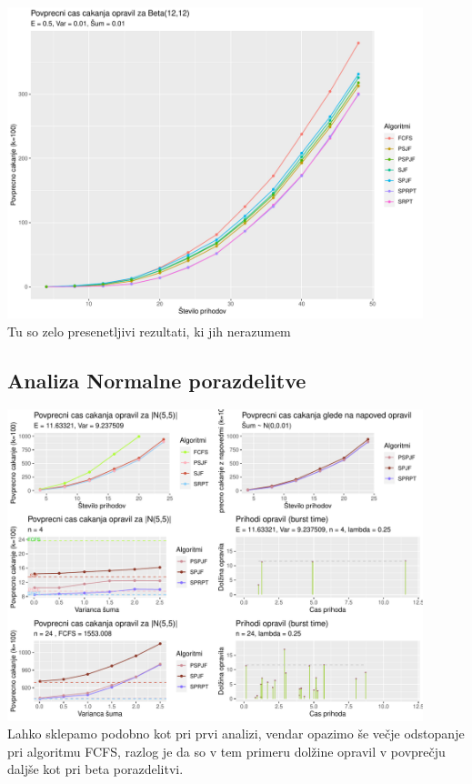 \documentclass[a4paper, pt14]{article}
\begin{document}
\includegraphics[width=12.1cm,keepaspectratio]{Beta_grafi_majhna.pdf}
\\
Tu so zelo presenetljivi rezultati, ki jih nerazumem

\subsection{Analiza Normalne porazdelitve}

\includegraphics[width=12.1cm,keepaspectratio]{Normalna_grafi.pdf}
\\ Lahko sklepamo podobno kot pri prvi analizi, vendar opazimo še večje odstopanje pri algoritmu FCFS, razlog je da so v tem primeru dolžine opravil v povprečju daljše kot pri beta porazdelitvi. 
\end{document}
